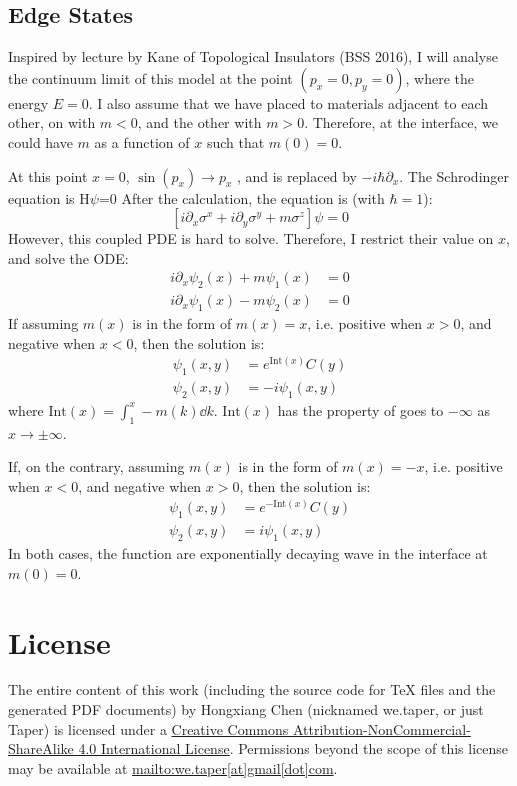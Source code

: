 \documentclass{article}
\begin{document}
\subsection{Edge States}
\label{sec:Edge States}
Inspired by lecture by Kane of Topological Insulators (BSS 2016), I
will analyse the continuum limit of this model at the  point
$(p_x=0,p_y=0)$, where the energy $E=0$. I also assume that we have placed
to materials adjacent to each other, on with $m<0$, and the other with
$m>0$. Therefore, at the interface, we could have $m$ as a function of
$x$ such that $m(0)=0$.

At this point $x=0$, $\sin(p_x)\to p_x$ , and is replaced by $-i\hbar
\partial _x$. The Schrodinger equation is H$\psi $=0 After the
calculation, the equation is (with $\hbar=1$):
\begin{equation}
    \left[i\partial_x \sigma^x + i\partial_y \sigma^y +
    m\sigma^z\right] \psi = 0
\end{equation}
However, this coupled PDE is hard to solve. Therefore, I restrict
their value on $x$, and solve the ODE:
\begin{align}
    i\partial_x \psi_2(x) + m\psi_1(x) &= 0 \\
    i\partial_x \psi_1(x) - m\psi_2(x) &= 0
\end{align}
If assuming $m(x)$ is in the form of $m(x)=x$, i.e. positive when
$x>0$, and negative when $x<0$, then the solution is:
\begin{align}
    \psi_1 (x,y) &= e^{\text{Int}(x)} C(y) \\
    \psi_2 (x,y) &= -i \psi_1(x,y)
\end{align}
where $\text{Int}(x)=\int_1^x -m(k)\dd{k}$. $\text{Int}(x)$ has the
property of goes to $-\infty$ as $x\to \pm\infty$.

If, on the contrary, assuming $m(x)$ is in the form of $m(x)=-x$, i.e. positive when $x<0$, and negative when $x>0$, then the solution is:
\begin{align}
    \psi_1 (x,y) &= e^{-\text{Int}(x)} C(y) \\
    \psi_2 (x,y) &= i \psi_1(x,y)
\end{align}
In both cases, the function are exponentially decaying wave in the
interface at $m(0)=0$.

\section{License}
The entire content of this work (including the source code
for TeX files and the generated PDF documents) by 
Hongxiang Chen (nicknamed we.taper, or just Taper) is
licensed under a 
\href{http://creativecommons.org/licenses/by-nc-sa/4.0/}{Creative 
Commons Attribution-NonCommercial-ShareAlike 4.0 International 
License}. Permissions beyond the scope of this 
license may be available at \url{mailto:we.taper[at]gmail[dot]com}.
\end{document}
